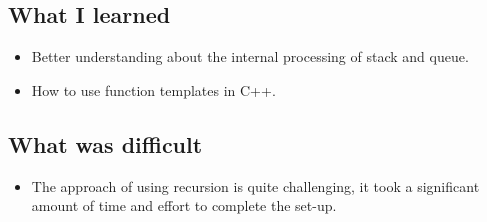 \documentclass[a4paper, 12pt]{article}
\begin{document}
\subsection{What I learned}
\begin{flushleft}
  \begin{itemize}
    \item Better understanding about the internal processing of stack and queue.
    \item How to use function templates in C++.
  \end{itemize}
\end{flushleft}
\subsection{What was difficult}
\begin{flushleft}
  \begin{itemize}
    \item The approach of using recursion is quite challenging, it took a significant amount of time and effort to complete the set-up.
  \end{itemize}
\end{flushleft}
\end{document}
